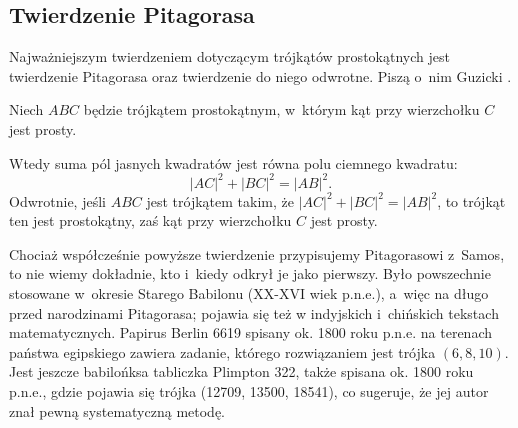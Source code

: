 %

\subsection{Twierdzenie Pitagorasa}
Najważniejszym twierdzeniem dotyczącym trójkątów prostokątnych jest twierdzenie Pitagorasa oraz twierdzenie do niego odwrotne.
Piszą o~nim Guzicki \cite[s. 160]{guzicki_2021}.


\begin{theorem}[Pitagorasa]
\label{theorem_pythagorean}%
    Niech $ABC$ będzie trójkątem prostokątnym, w~którym kąt przy wierzchołku $C$ jest prosty.
    \begin{center}
\begin{comment}
        \begin{tikzpicture}[scale=.4]
        \tkzDefPoint(105:3){A}
        \tkzDefPoint(285:3){B}
        \tkzDefPoint(35:3){C}
        \tkzDefPoint(35:4.75){CC}
        \tkzMarkRightAngle[size=0.5](A,C,B)

        \tkzLabelPoint[above left](A){$A$}
        \tkzLabelPoint[below](B){$B$}
        \tkzLabelPoint[below left](CC){$C$}
        \tkzDefSquare(B,A)
        \tkzDrawPolygon[fill=black!50](B,A,tkzFirstPointResult, tkzSecondPointResult)
        \tkzDefSquare(C,B)
        \tkzDrawPolygon[fill=black!25](C,B,tkzFirstPointResult, tkzSecondPointResult)
        \tkzDefSquare(A,C)
        \tkzDrawPolygon[fill=black!25](A,C,tkzFirstPointResult, tkzSecondPointResult)
        \tkzDrawPolygon[line width=0.4mm](A,B,C)
    \end{tikzpicture}
\end{comment}
    \end{center}
    Wtedy suma pól jasnych kwadratów jest równa polu ciemnego kwadratu:
    \begin{equation}
        |AC|^2 + |BC|^2 = |AB|^2.
    \end{equation}
    Odwrotnie, jeśli $ABC$ jest trójkątem takim, że $|AC|^2 + |BC|^2 = |AB|^2$, to trójkąt ten jest prostokątny, zaś kąt przy wierzchołku $C$ jest prosty.
\end{theorem}

Chociaż współcześnie powyższe twierdzenie przypisujemy Pitagorasowi z~Samos, to nie wiemy dokładnie, kto i~kiedy odkrył je jako pierwszy.
%
Było powszechnie stosowane w~okresie Starego Babilonu (XX-XVI wiek p.n.e.), a~więc na długo przed narodzinami Pitagorasa; pojawia się też w indyjskich i~chińskich tekstach matematycznych.
Papirus Berlin 6619 spisany ok. 1800 roku p.n.e. na terenach państwa egipskiego zawiera zadanie, którego rozwiązaniem jest trójka $(6, 8, 10)$.
%
Jest jeszcze babilońksa tabliczka Plimpton 322, także spisana ok. 1800 roku p.n.e., gdzie pojawia się trójka (12709, 13500, 18541), co sugeruje, że jej autor znał pewną systematyczną metodę.
%

